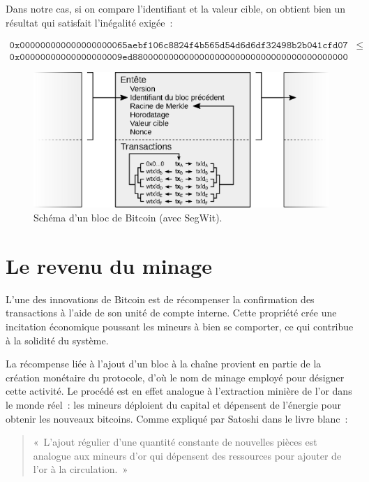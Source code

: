 Dans notre cas, si on compare l'identifiant et la valeur cible, on obtient bien un résultat qui satisfait l'inégalité exigée~: 

{ \footnotesize
\begin{align*}
\mathtt{0x000000000000000000065aebf106c8824f4b565d54d6d6df32498b2b041cfd07} & \le \\ \mathtt{0x00000000000000000009ed880000000000000000000000000000000000000000} & ~
\end{align*}
}

\begin{figure}[h]
  \centering
  \includegraphics[scale=0.75]{img/bitcoin-segwit-block.eps}
  \caption{Schéma d'un bloc de Bitcoin (avec SegWit).}
  \label{fig:bitcoin-segwit-block}
\end{figure}

\section*{Le revenu du minage} %


L'une des innovations de Bitcoin est de récompenser la confirmation des transactions à l'aide de son unité de compte interne. Cette propriété crée une incitation économique poussant les mineurs à bien se comporter, ce qui contribue à la solidité du système.

La récompense liée à l'ajout d'un bloc à la chaîne provient en partie de la création monétaire du protocole, d'où le nom de minage employé pour désigner cette activité. Le procédé est en effet analogue à l'extraction minière de l'or dans le monde réel~: les mineurs déploient du capital et dépensent de l'énergie pour obtenir les nouveaux bitcoins. Comme expliqué par Satoshi dans le livre blanc~:

\begin{quote}
«~L'ajout régulier d'une quantité constante de nouvelles pièces est analogue aux mineurs d'or qui dépensent des ressources pour ajouter de l'or à la circulation.~»
\end{quote}

